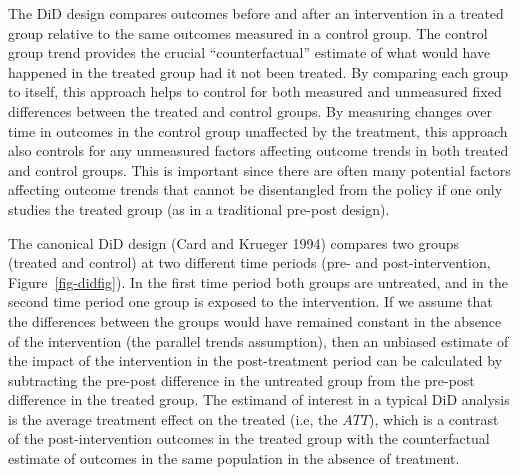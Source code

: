 \documentclass[
  letterpaper,
  DIV=11,
  numbers=noendperiod]{scrartcl}
\begin{document}
The DiD design compares outcomes before and after an intervention in a
treated group relative to the same outcomes measured in a control group.
The control group trend provides the crucial ``counterfactual'' estimate
of what would have happened in the treated group had it not been
treated. By comparing each group to itself, this approach helps to
control for both measured and unmeasured fixed differences between the
treated and control groups. By measuring changes over time in outcomes
in the control group unaffected by the treatment, this approach also
controls for any unmeasured factors affecting outcome trends in both
treated and control groups. This is important since there are often many
potential factors affecting outcome trends that cannot be disentangled
from the policy if one only studies the treated group (as in a
traditional pre-post design).

The canonical DiD design (Card and Krueger 1994) compares two groups
(treated and control) at two different time periods (pre- and
post-intervention, Figure~\ref{fig-didfig}). In the first time period
both groups are untreated, and in the second time period one group is
exposed to the intervention. If we assume that the differences between
the groups would have remained constant in the absence of the
intervention (the parallel trends assumption), then an unbiased estimate
of the impact of the intervention in the post-treatment period can be
calculated by subtracting the pre-post difference in the untreated group
from the pre-post difference in the treated group. The estimand of
interest in a typical DiD analysis is the average treatment effect on
the treated (i.e, the \(ATT\)), which is a contrast of the
post-intervention outcomes in the treated group with the counterfactual
estimate of outcomes in the same population in the absence of treatment.
\end{document}
